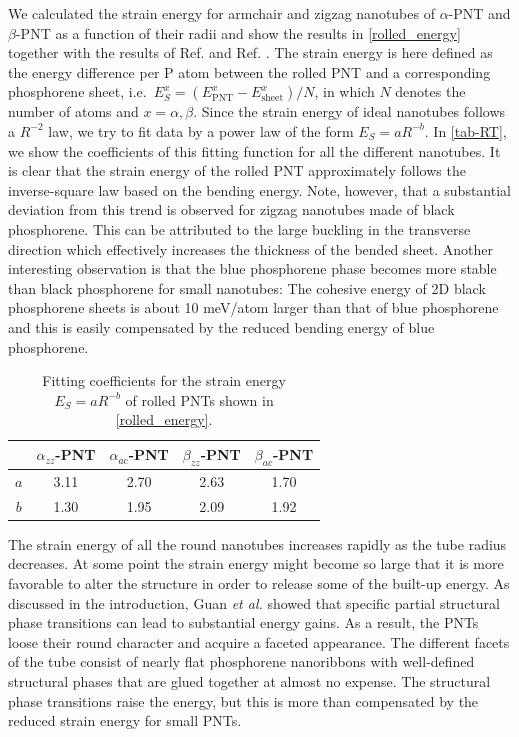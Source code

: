 We calculated the strain energy for armchair and zigzag nanotubes of $\alpha$-PNT and $\beta$-PNT as a function of their radii and show the results in \autoref{rolled_energy} together with the results of Ref. \cite{Guan2014a} and Ref. \cite{Guo2014}. The strain energy is here defined as the energy difference per P atom between the rolled PNT and a corresponding phosphorene sheet, i.e.~$E^{x}_S=(E_{\text{PNT}}^{x}-E_{\text{sheet}}^{x})/N$, in which $N$ denotes the number of atoms and $x=\alpha,\beta$. Since the strain energy of ideal nanotubes follows a $R^{-2}$ law, we try to fit data by a power law of the form $E_S=aR^{-b}$. In \autoref{tab-RT}, we show the coefficients of this fitting function for all the different nanotubes. It is clear that the strain energy of the rolled PNT approximately follows the inverse-square law based on the bending energy. Note, however, that a substantial deviation from this trend is observed for zigzag nanotubes made of black phosphorene. This can be attributed to the large buckling in the transverse direction which effectively increases the thickness of the bended sheet. Another interesting observation is that the blue phosphorene phase becomes more stable than black phosphorene for small nanotubes: The cohesive energy of 2D black phosphorene sheets is about 10 meV/atom larger than that of blue phosphorene\cite{Guan2014a} and this is easily compensated by the reduced bending energy of blue phosphorene. 

\begin{table}[htb] \centering
\caption{Fitting coefficients for the strain energy $E_S=aR^{-b}$ of rolled PNTs shown in \autoref{rolled_energy}.\label{tab-RT}}
\begin{tabular}{c|cccc}
\hline\hline    
        & $\alpha_{zz}$-PNT  & $\alpha_{ac}$-PNT  & $\beta_{zz}$-PNT   & $\beta_{ac}$-PNT \\
\hline
$a$			&   3.11   &   2.70  &   2.63   &   1.70  \\ 
$b$		  &   1.30   &   1.95   &   2.09   &   1.92  \\
\hline\hline
\end{tabular}
\end{table}

The strain energy of all the round nanotubes increases rapidly as the tube radius decreases. At some point the strain energy might become so large that it is more favorable to alter the structure in order to release some of the built-up energy. As discussed in the introduction, Guan \textit{et al.}\cite{Guan2014a} showed that specific partial structural phase transitions can lead to substantial energy gains. As a result, the PNTs loose their round character and acquire a faceted appearance. The different facets of the tube consist of nearly flat phosphorene nanoribbons with well-defined structural phases that are glued together at almost no expense. The structural phase transitions raise the energy, but this is more than compensated by the reduced strain energy for small PNTs. 

